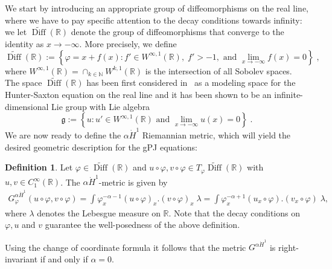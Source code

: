 \documentclass[11pt,reqno]{amsart}
\theoremstyle{definition}
\newtheorem{definition}[theorem]{Definition}
\newcommand{\R}{\mathbb R}
\newcommand{\dx}{\lambda}
\newcommand{\DiffRshift}{\widetilde{\operatorname{Diff}}(\mathbb R)}
\newcommand{\DiffRLie}{\mathfrak g}
\begin{document}
We start by introducing an appropriate group of diffeomorphisms on the real line, where we have to pay specific attention to the decay conditions towards infinity: we let $\DiffRshift$ denote the group of diffeomorphisms that converge to the identity as $x\to -\infty$. More precisely, we define
\begin{equation*}
    \DiffRshift:=\left\{\varphi=x+f(x): f'\in W^{\infty,1}(\mathbb R),\; f'>-1, \text{ and }\lim_{x\to-\infty}f(x)=0\right\}\;,
\end{equation*}
where $W^{\infty,1}(\mathbb R)=\cap_{k\in\mathbb{N}} W^{k,1}(\mathbb R)$ is the intersection of all Sobolev spaces. 
The space $\DiffRshift$ has been first considered in~\cite{bauer2014homogeneous} as a modeling space for the Hunter-Saxton equation on the real line and it has been shown to be an infinite-dimensional Lie group with Lie algebra
\begin{equation*}
    \DiffRLie:=\left\{u: u'\in W^{\infty,1}(\mathbb R)\text{ and }\lim_{x\to-\infty}u(x)=0\right\}\;.
\end{equation*}
We are now ready to define the $\alpha\dot H^1$ Riemannian metric, which will yield the desired geometric description for the gPJ equations:

\begin{definition}
Let $\varphi\in \DiffRshift$ and $u\circ\varphi,v\circ\varphi \in T_\varphi\DiffRshift$ with $u,v\in C_1^{\infty}(\R)$.  The $\alpha\dot H^1$-metric is given by
\begin{align*}\label{alpha-doth1}
G^{\alpha\dot H^1}_{\varphi}(u\circ\varphi,v\circ\varphi)=\int \varphi_x^{-\alpha-1}(u\circ\varphi)_x.(v\circ\varphi)_x\;\dx
=\int \varphi_x^{-\alpha+1}(u_x\circ\varphi).(v_x\circ\varphi)\;\dx,
\end{align*}
where $\dx$ denotes the Lebesgue measure on $\mathbb R$. 
Note that the decay conditions on $\varphi, u$ and $v$ guarantee the well-posedness of the above definition. 
\end{definition}
Using the change of coordinate formula it follows that the metric $G^{\alpha\dot H^1}$ is right-invariant if and only if $\alpha=0$.
\end{document}
